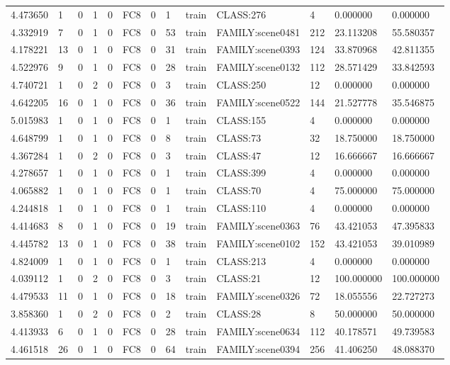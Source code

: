 \begin{tabular}{lllllllllllll}
4.473650 & 1 & 0 & 1 & 0 & FC8 & 0 & 1 & train & CLASS:276 & 4 & 0.000000 & 0.000000 \\
4.332919 & 7 & 0 & 1 & 0 & FC8 & 0 & 53 & train & FAMILY:scene0481 & 212 & 23.113208 & 55.580357 \\
4.178221 & 13 & 0 & 1 & 0 & FC8 & 0 & 31 & train & FAMILY:scene0393 & 124 & 33.870968 & 42.811355 \\
4.522976 & 9 & 0 & 1 & 0 & FC8 & 0 & 28 & train & FAMILY:scene0132 & 112 & 28.571429 & 33.842593 \\
4.740721 & 1 & 0 & 2 & 0 & FC8 & 0 & 3 & train & CLASS:250 & 12 & 0.000000 & 0.000000 \\
4.642205 & 16 & 0 & 1 & 0 & FC8 & 0 & 36 & train & FAMILY:scene0522 & 144 & 21.527778 & 35.546875 \\
5.015983 & 1 & 0 & 1 & 0 & FC8 & 0 & 1 & train & CLASS:155 & 4 & 0.000000 & 0.000000 \\
4.648799 & 1 & 0 & 1 & 0 & FC8 & 0 & 8 & train & CLASS:73 & 32 & 18.750000 & 18.750000 \\
4.367284 & 1 & 0 & 2 & 0 & FC8 & 0 & 3 & train & CLASS:47 & 12 & 16.666667 & 16.666667 \\
4.278657 & 1 & 0 & 1 & 0 & FC8 & 0 & 1 & train & CLASS:399 & 4 & 0.000000 & 0.000000 \\
4.065882 & 1 & 0 & 1 & 0 & FC8 & 0 & 1 & train & CLASS:70 & 4 & 75.000000 & 75.000000 \\
4.244818 & 1 & 0 & 1 & 0 & FC8 & 0 & 1 & train & CLASS:110 & 4 & 0.000000 & 0.000000 \\
4.414683 & 8 & 0 & 1 & 0 & FC8 & 0 & 19 & train & FAMILY:scene0363 & 76 & 43.421053 & 47.395833 \\
4.445782 & 13 & 0 & 1 & 0 & FC8 & 0 & 38 & train & FAMILY:scene0102 & 152 & 43.421053 & 39.010989 \\
4.824009 & 1 & 0 & 1 & 0 & FC8 & 0 & 1 & train & CLASS:213 & 4 & 0.000000 & 0.000000 \\
4.039112 & 1 & 0 & 2 & 0 & FC8 & 0 & 3 & train & CLASS:21 & 12 & 100.000000 & 100.000000 \\
4.479533 & 11 & 0 & 1 & 0 & FC8 & 0 & 18 & train & FAMILY:scene0326 & 72 & 18.055556 & 22.727273 \\
3.858360 & 1 & 0 & 2 & 0 & FC8 & 0 & 2 & train & CLASS:28 & 8 & 50.000000 & 50.000000 \\
4.413933 & 6 & 0 & 1 & 0 & FC8 & 0 & 28 & train & FAMILY:scene0634 & 112 & 40.178571 & 49.739583 \\
4.461518 & 26 & 0 & 1 & 0 & FC8 & 0 & 64 & train & FAMILY:scene0394 & 256 & 41.406250 & 48.088370 \\

\end{tabular}
